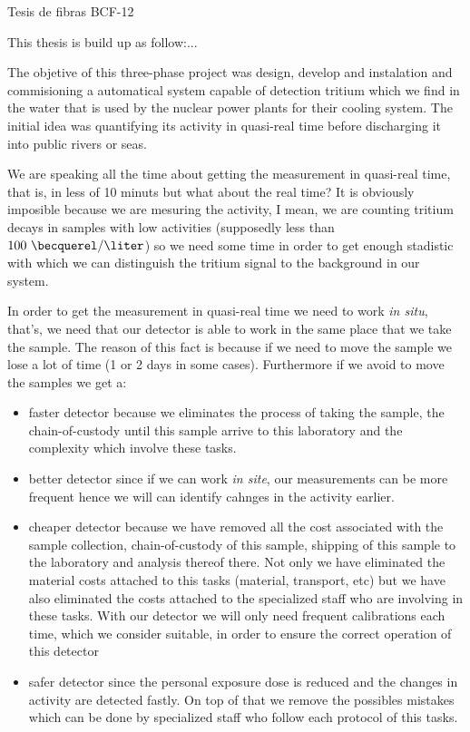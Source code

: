 Tesis de fibras BCF-12

This thesis is build up as follow:...



The objetive of this three-phase project was design, develop and instalation and commisioning a automatical system capable of detection tritium which we find in the water that is used by the nuclear power plants for their cooling system. The initial idea was quantifying its activity in quasi-real time before discharging it into public rivers or seas. 

We are speaking all the time about getting the measurement in quasi-real time, that is, in less of 10 minuts but what about the real time? It is obviously imposible because we are mesuring the activity, I mean, we are counting tritium decays in samples with low activities (supposedly less than $100~\becquerel/\liter$) so we need some time in order to get enough stadistic with which we can distinguish the tritium signal to the background in our system.

In order to get the measurement in quasi-real time we need to work \textit{in situ}, that's, we need that our detector is able to work in the same place that we take the sample. The reason of this fact is because if we need to move the sample we lose a lot of time (1 or 2 days in some cases). Furthermore if we avoid to move the samples we get a:

\begin{itemize}
\item{} faster detector because we eliminates the process of taking the sample, the chain-of-custody until this sample arrive to this laboratory and the complexity which involve these tasks. 

\item{} better detector since if we can work \textit{in site}, our measurements can be more frequent hence we will can identify cahnges in the activity earlier.

\item{} cheaper detector because we have removed all the cost associated with the sample collection, chain-of-custody of this sample, shipping of this sample to the laboratory and analysis thereof there. Not only we have eliminated the material costs attached to this tasks (material, transport, etc) but we have also eliminated the costs attached to the specialized staff who are involving in these tasks. With our detector we will only need frequent calibrations each time, which we consider suitable, in order to ensure the correct operation of this detector

\item{} safer detector since the personal exposure dose is reduced and the changes in activity are detected fastly. On top of that we remove the possibles mistakes which can be done by specialized staff who follow each protocol of this tasks.

\end{itemize} 

